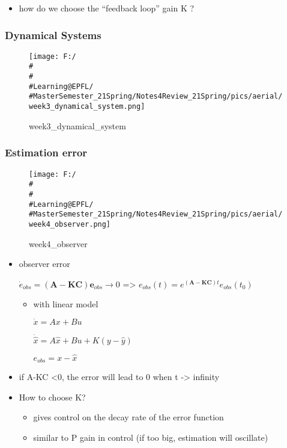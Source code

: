 \documentclass[]{article}
\begin{document}
\begin{itemize}
\item
  how do we choose the ``feedback loop'' gain K ?
\end{itemize}

\subsubsection{Dynamical Systems}\label{header-n869}

\begin{figure}
\centering
\texttt{[image: F:/\\\#\\\#\\\#Learning@EPFL/\\\#MasterSemester\_21Spring/Notes4Review\_21Spring/pics/aerial/week3\_dynamical\_system.png]}
\caption{week3\_dynamical\_system}
\end{figure}

\subsubsection{Estimation error}\label{header-n871}

\begin{figure}
\centering
\texttt{[image: F:/\\\#\\\#\\\#Learning@EPFL/\\\#MasterSemester\_21Spring/Notes4Review\_21Spring/pics/aerial/week4\_observer.png]}
\caption{week4\_observer}
\end{figure}

\begin{itemize}
\item
  observer error

  \(\dot{e}_{o b s}=(\boldsymbol{A}-\boldsymbol{K} \boldsymbol{C}) \boldsymbol{e}_{o b s} \rightarrow 0\)
  =\textgreater{}
  \(e_{o b s}(t)=e^{(\boldsymbol{A}-\boldsymbol{K} \boldsymbol{C}) t} e_{o b s}\left(t_{0}\right)\)

  \begin{itemize}
  \item
    with linear model

    \(\dot{x} = Ax + Bu\)

    \(\dot{\hat{x}} = A\hat{x} + Bu + K (y-\hat{y})\)

    \(e_{obs} = x - \hat{x}\)
  \end{itemize}
\item
  if A-KC \textless{}0, the error will lead to 0 when t -\textgreater{}
  infinity
\item
  How to choose K?

  \begin{itemize}
  \item
    gives control on the decay rate of the error function
  \item
    similar to P gain in control (if too big, estimation will oscillate)
  \end{itemize}
\end{itemize}
\end{document}
